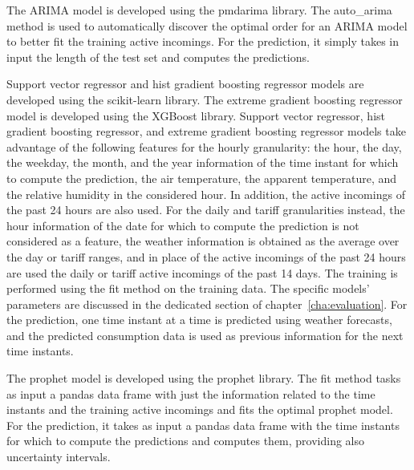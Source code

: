 The ARIMA model is developed using the pmdarima library.
The auto\_arima method is used to automatically discover the optimal order for an ARIMA model to better fit the training active incomings.
For the prediction, it simply takes in input the length of the test set and computes the predictions.

Support vector regressor and hist gradient boosting regressor models are developed using the scikit-learn library.
The extreme gradient boosting regressor model is developed using the XGBoost library.
Support vector regressor, hist gradient boosting regressor, and extreme gradient boosting regressor models take advantage of the following features for the hourly granularity: the hour, the day, the weekday, the month, and the year information of the time instant for which to compute the prediction, the air temperature, the apparent temperature, and the relative humidity in the considered hour.
In addition, the active incomings of the past 24 hours are also used.
For the daily and tariff granularities instead, the hour information of the date for which to compute the prediction is not considered as a feature, the weather information is obtained as the average over the day or tariff ranges, and in place of the active incomings of the past 24 hours are used the daily or tariff active incomings of the past 14 days.
The training is performed using the fit method on the training data.
The specific models’ parameters are discussed in the dedicated section of chapter~\ref{cha:evaluation}.
For the prediction, one time instant at a time is predicted using weather forecasts, and the predicted consumption data is used as previous information for the next time instants.

The prophet model is developed using the prophet library.
The fit method tasks as input a pandas data frame with just the information related to the time instants and the training active incomings and fits the optimal prophet model.
For the prediction, it takes as input a pandas data frame with the time instants for which to compute the predictions and computes them, providing also uncertainty intervals.

